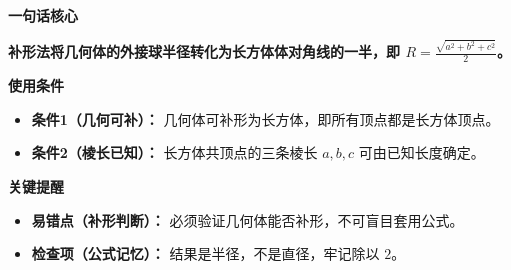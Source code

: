 \begin{summarybox}
	\textbf{\textcolor{CSummary}{一句话核心}}

	\textbf{补形法将几何体的外接球半径转化为长方体体对角线的一半，即 $R = \frac{\sqrt{a^{2}+b^{2}+c^{2}}}{2}$。}

	\medskip
	\textbf{\textcolor{CSummary}{使用条件}}
	\begin{itemize}[leftmargin=*, itemsep=0.5em, topsep=0.4em]
		\item \textbf{条件1（几何可补）：} 几何体可补形为长方体，即所有顶点都是长方体顶点。
		\item \textbf{条件2（棱长已知）：} 长方体共顶点的三条棱长 $a,b,c$ 可由已知长度确定。
	\end{itemize}

	\medskip
	\textbf{\textcolor{CSummary}{关键提醒}}
	\begin{itemize}[leftmargin=*, itemsep=0.5em, topsep=0.4em]
		\item \textbf{易错点（补形判断）：} 必须验证几何体能否补形，不可盲目套用公式。
		\item \textbf{检查项（公式记忆）：} 结果是半径，不是直径，牢记除以 $2$。
	\end{itemize}
\end{summarybox}
